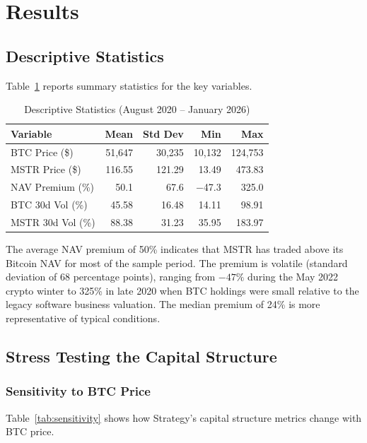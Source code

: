\section{Results}
\label{sec:results}

\subsection{Descriptive Statistics}

Table~\ref{tab:descriptive} reports summary statistics for the key variables.

\begin{table}[H]
\centering
\caption[Descriptive Statistics]{Descriptive Statistics (August 2020 -- January 2026)}
\label{tab:descriptive}
\begin{tabular}{@{}lrrrr@{}}
\toprule
\textbf{Variable} & \textbf{Mean} & \textbf{Std Dev} & \textbf{Min} & \textbf{Max} \\
\midrule
BTC Price (\$) & 51,647 & 30,235 & 10,132 & 124,753 \\
MSTR Price (\$) & 116.55 & 121.29 & 13.49 & 473.83 \\
NAV Premium (\%) & 50.1 & 67.6 & $-$47.3 & 325.0 \\
BTC 30d Vol (\%) & 45.58 & 16.48 & 14.11 & 98.91 \\
MSTR 30d Vol (\%) & 88.38 & 31.23 & 35.95 & 183.97 \\
\bottomrule
\end{tabular}
\end{table}

The average NAV premium of 50\% indicates that MSTR has traded above its Bitcoin NAV for most of the sample period. The premium is volatile (standard deviation of 68 percentage points), ranging from $-47\%$ during the May 2022 crypto winter to 325\% in late 2020 when BTC holdings were small relative to the legacy software business valuation. The median premium of 24\% is more representative of typical conditions.

\subsection{Stress Testing the Capital Structure}

\subsubsection{Sensitivity to BTC Price}

Table~\ref{tab:sensitivity} shows how Strategy's capital structure metrics change with BTC price.

